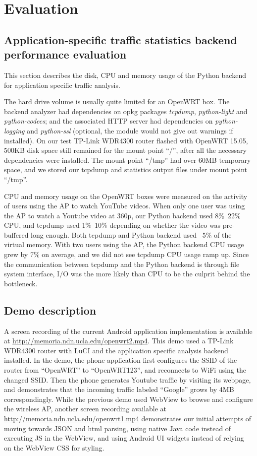 \section{Evaluation}


\subsection{Application-specific traffic statistics backend performance evaluation}

This section describes the disk, CPU and memory usage of the Python backend for application specific traffic analysis. 

The hard drive volume is usually quite limited for an OpenWRT box. The backend analyzer had dependencies on opkg packages \textit{tcpdump}, \textit{python-light} and \textit{python-codecs}; and the associated HTTP server had dependencies on \textit{python-logging} and \textit{python-ssl} (optional, the module would not give out warnings if installed). On our test TP-Link WDR4300 router flashed with OpenWRT 15.05, 500KB disk space still remained for the mount point ``/'', after all the necessary dependencies were installed. The mount point ``/tmp'' had over 60MB temporary space, and we stored our tcpdump and statistics output files under mount point ``/tmp''.

CPU and memory usage on the OpenWRT boxes were measured on the activity of users using the AP to watch YouTube videos. When only one user was using the AP to watch a Youtube video at 360p, our Python backend used 8\%~22\% CPU, and tcpdump used 1\%~10\% depending on whether the video was pre-buffered long enough. Both tcpdump and Python backend used ~5\% of the virtual memory. With two users using the AP, the Python backend CPU usage grew by 7\% on average, and we did not see tcpdump CPU usage ramp up. Since the communication between tcpdump and the Python backend is through file system interface, I/O was the more likely than CPU to be the culprit behind the bottleneck.

\subsection{Demo description}

A screen recording of the current Android application implementation is available at \url{http://memoria.ndn.ucla.edu/openwrt2.mp4}. This demo used a TP-Link WDR4300 router with LuCI and the application specific analysis backend installed. In the demo, the phone application first configures the SSID of the router from ``OpenWRT'' to ``OpenWRT123'', and reconnects to WiFi using the changed SSID. Then the phone generates Youtube traffic by visiting its webpage, and demonstrates that the incoming traffic labeled ``Google'' grows by 4MB correspondingly. While the previous demo used WebView to browse and configure the wireless AP, another screen recording available at \url{http://memoria.ndn.ucla.edu/openwrt1.mp4} demonstrates our initial attempts of moving towards JSON and html parsing, using native Java code instead of executing JS in the WebView, and using Android UI widgets instead of relying on the WebView CSS for styling.